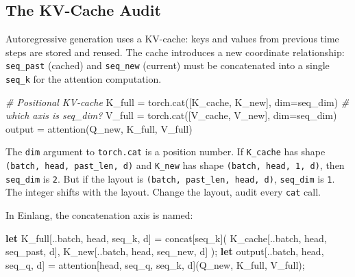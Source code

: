 \documentclass[11pt,titlepage]{article}
\newenvironment{Shaded}{}{}
\newcommand{\CommentTok}[1]{\textcolor[rgb]{0.38,0.63,0.69}{\textit{#1}}}
\newcommand{\KeywordTok}[1]{\textcolor[rgb]{0.00,0.44,0.13}{\textbf{#1}}}
\newcommand{\NormalTok}[1]{#1}
\newcommand{\OperatorTok}[1]{\textcolor[rgb]{0.40,0.40,0.40}{#1}}
\begin{document}
\vspace{2em}

\hypertarget{the-kv-cache-audit}{%
\subsection{The KV-Cache Audit}\label{the-kv-cache-audit}}

Autoregressive generation uses a KV-cache: keys and values from previous
time steps are stored and reused. The cache introduces a new coordinate
relationship: \texttt{seq\_past} (cached) and \texttt{seq\_new}
(current) must be concatenated into a single \texttt{seq\_k} for the
attention computation.

\begin{Shaded}
\begin{Highlighting}[]
\CommentTok{# Positional KV-cache}
\NormalTok{K_full }\OperatorTok{=}\NormalTok{ torch.cat([K_cache, K_new], dim}\OperatorTok{=}\NormalTok{seq_dim)  }\CommentTok{# which axis is seq_dim?}
\NormalTok{V_full }\OperatorTok{=}\NormalTok{ torch.cat([V_cache, V_new], dim}\OperatorTok{=}\NormalTok{seq_dim)}
\NormalTok{output }\OperatorTok{=}\NormalTok{ attention(Q_new, K_full, V_full)}
\end{Highlighting}
\end{Shaded}

The \texttt{dim} argument to \texttt{torch.cat} is a position number. If
\texttt{K\_cache} has shape \texttt{(batch,\ head,\ past\_len,\ d)} and
\texttt{K\_new} has shape \texttt{(batch,\ head,\ 1,\ d)}, then
\texttt{seq\_dim} is \texttt{2}. But if the layout is
\texttt{(batch,\ past\_len,\ head,\ d)}, \texttt{seq\_dim} is
\texttt{1}. The integer shifts with the layout. Change the layout, audit
every \texttt{cat} call.

In Einlang, the concatenation axis is named:

\begin{Shaded}
\begin{Highlighting}[]
\KeywordTok{let}\NormalTok{ K_full}\OperatorTok{[}\NormalTok{..batch, head, seq_k, d}\OperatorTok{]}\NormalTok{ = concat}\OperatorTok{[}\NormalTok{seq_k}\OperatorTok{]}\NormalTok{(}
\NormalTok{    K_cache}\OperatorTok{[}\NormalTok{..batch, head, seq_past, d}\OperatorTok{]}\NormalTok{,}
\NormalTok{    K_new}\OperatorTok{[}\NormalTok{..batch, head, seq_new, d}\OperatorTok{]}
\NormalTok{);}
\KeywordTok{let}\NormalTok{ output}\OperatorTok{[}\NormalTok{..batch, head, seq_q, d}\OperatorTok{]}\NormalTok{ = attention}\OperatorTok{[}\NormalTok{head, seq_q, seq_k, d}\OperatorTok{]}\NormalTok{(Q_new, K_full, V_full);}
\end{Highlighting}
\end{Shaded}
\end{document}
